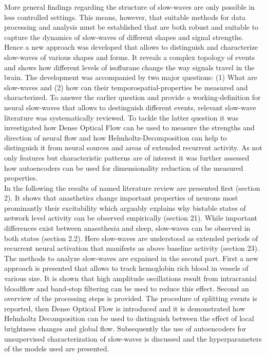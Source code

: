 More general findings regarding the structure of slow-waves are only possible in less controlled settings. This means, however, that suitable methods for data processing and analysis must be established that are both robust and suitable to capture the dynamics of slow-waves of different shapes and signal strengths.\\
Hence a new approach was developed that allows to distinguish and characterize slow-waves of various shapes and forms. It reveals a complex topology of events and shows how different levels of isoflurane change the way signals travel in the brain. The development was accompanied by two major questions: (1) What are slow-waves and  (2) how can their temporospatial-properties be measured and characterized. To answer the earlier question and provide a working-definition for neural slow-waves that allows to destinguish different events, relevant slow-wave literature was systematically reviewed. To tackle the latter question it was investigated how Dense Optical Flow can be used to measure the strengths and direction of neural flow and how Helmholtz-Decomposition can help to distinguish it from neural sources and areas of extended recurrent activity. As not only features but characteristic patterns are of interest it was further assessed how autoencoders can be used for dimensionality reduction of the measured properties.\\
In the following the results of named literature review are presented first (section 2). It shows that anasthetics change important properties of neurons most prominantly their excitability which arguably explains why bistable states of network level activity can be observed empirically (section 21). While important differences exist between anaesthesia and sleep, slow-waves can be observed in both states (section 2.2). Here slow-waves are understood as extended periods of recurrent neural activation that manifests as above baseline activity (section 23). \\
The methods to analyze slow-waves are expained in the second part. First a new approach is presented that allows to track hemoglobin rich blood in vessels of various size. It is shown that high amplitude oscillations result from intracranial bloodflow and band-stop filtering can be used to reduce this effect. Second an overview of the processing steps is provided. The procedure of splitting events is reported, then Dense Optical Flow is introduced and it is demonstrated how Helmholtz Decomposition can be used to distinguish between the effect of local brightness changes and global flow. Subsequently the use of autoencoders for unsupervised characterization of slow-waves is discussed and the hyperparameters of the models used are presented. \\

